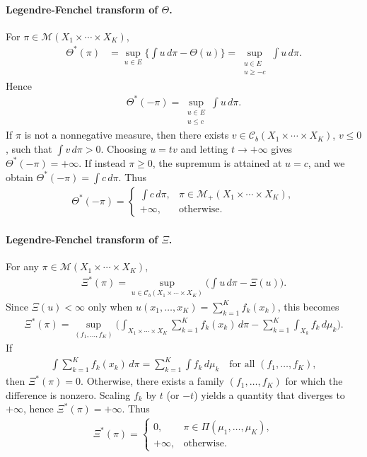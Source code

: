 \documentclass[10pt,a4paper]{amsart}
\theoremstyle{plain}
\theoremstyle{definition}
\theoremstyle{remark}
\begin{document}
\paragraph{Legendre-Fenchel transform of \(\Theta\).}
For \(\pi\in \mathcal{M}(X_{1}\times\cdots\times X_{K})\),
\begin{align*}
\Theta^{\ast}(\pi)
&=
\sup_{u\in E}
\Big\{
\int u\, d\pi - \Theta(u)
\Big\}
=
\sup_{\substack{u\in E\\ u\ge -c}}
\int u\, d\pi.
\end{align*}
Hence
\begin{align*}
\Theta^{\ast}(-\pi)
=
\sup_{\substack{u\in E\\ u\le c}}
\int u\, d\pi.
\end{align*}
If \(\pi\) is not a nonnegative measure, then there exists
\(v\in \mathcal{C}_{b}(X_{1}\times\cdots\times X_{K})\), \(v\le 0\), such that
\(\int v\, d\pi>0\). Choosing \(u=t v\) and letting \(t\to +\infty\)
gives \(\Theta^{\ast}(-\pi)=+\infty\). If instead \(\pi\ge 0\), the supremum is attained at \(u=c\), and we obtain $\Theta^{\ast}(-\pi)=\int c\, d\pi$. Thus
\begin{align*}
\Theta^{\ast}(-\pi)
=
\begin{cases}
\displaystyle \int c\, d\pi, & \pi\in \mathcal{M}_{+}(X_{1}\times\cdots\times X_{K}),\\[0.3em]
+\infty, & \text{otherwise}.
\end{cases}
\end{align*}
\paragraph{Legendre-Fenchel transform of \(\Xi\).}
For any \(\pi\in \mathcal{M}(X_{1}\times\cdots\times X_{K})\),
\begin{align*}
\Xi^{\ast}(\pi)
=
\sup_{u\in \mathcal{C}_{b}(X_{1}\times\cdots\times X_{K})}
\Big(
\int u\, d\pi - \Xi(u)
\Big).
\end{align*}
Since \(\Xi(u)<\infty\) only when 
\(
u(x_{1},\ldots,x_{K})=\sum_{k=1}^{K} f_{k}(x_{k})
\),
this becomes
\begin{align*}
\Xi^{\ast}(\pi)
=
\sup_{(f_{1},\ldots,f_{K})}
\Bigg(
\int_{X_{1}\times\cdots\times X_{K}}
\sum_{k=1}^{K} f_{k}(x_{k})\, d\pi
-
\sum_{k=1}^{K} \int_{X_{k}} f_{k} \, d\mu_{k}
\Bigg).
\end{align*}
If
\begin{align*}
\int \sum_{k=1}^{K} f_{k}(x_{k})\, d\pi
=
\sum_{k=1}^{K} \int f_{k}\, d\mu_{k}
\quad\text{for all }(f_{1},\ldots,f_{K}),
\end{align*}
then \(\Xi^{\ast}(\pi)=0\). Otherwise, there exists a family \((f_{1},\ldots,f_{K})\) for which the
difference is nonzero. Scaling \(f_{k}\) by \(t\) (or \(-t\)) yields a
quantity that diverges to \(+\infty\), hence \(\Xi^{\ast}(\pi)=+\infty\). Thus
\begin{align*}
\Xi^{\ast}(\pi)
=
\begin{cases}
0, & \pi\in \Pi(\mu_{1},\ldots,\mu_{K}),\\[0.3em]
+\infty, & \text{otherwise.}
\end{cases}
\end{align*}
\end{document}
